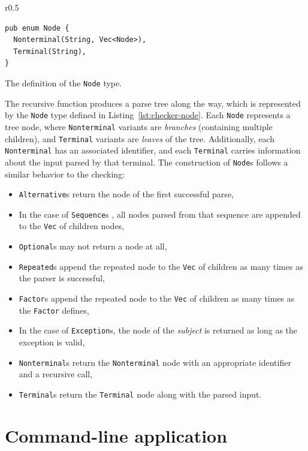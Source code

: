 \documentclass[english,bachelors,forcepolishlogotype]{wizthesis}
\begin{document}
\begin{wraplisting}{r}{0.5\textwidth}
  \begin{verbatim}
pub enum Node {
  Nonterminal(String, Vec<Node>),
  Terminal(String),
}
  \end{verbatim}
  \caption{The definition of the \texttt{Node} type.}
  \label{lst:checker-node}
\end{wraplisting}

The recursive function produces a parse tree along the way, which is represented
by the \texttt{Node} type defined in Listing~\ref{lst:checker-node}. Each
\texttt{Node} represents a tree node, where \texttt{Nonterminal} variants are
\emph{branches} (containing multiple children), and \texttt{Terminal} variants
are \emph{leaves} of the tree. Additionally, each \texttt{Nonterminal} has an
associated identifier, and each \texttt{Terminal} carries information about the
input parsed by that terminal. The construction of \texttt{Node}s follows a
similar behavior to the checking:
\begin{itemize}
  \item \texttt{Alternative}s return the node of the first successful parse,
  \item In the case of \texttt{Sequence}s , all nodes parsed from that sequence
  are appended to the \texttt{Vec} of children nodes,
  \item \texttt{Optional}s may not return a node at all,
  \item \texttt{Repeated}s append the repeated node to the \texttt{Vec} of
  children as many times as the parser is successful,
  \item \texttt{Factor}s append the repeated node to the \texttt{Vec} of
  children as many times as the \texttt{Factor} defines,
  \item In the case of \texttt{Exception}s, the node of the \emph{subject} is
  returned as long as the exception is valid,
  \item \texttt{Nonterminal}s return the \texttt{Nonterminal} node with an
  appropriate identifier and a recursive call,
  \item \texttt{Terminal}s return the \texttt{Terminal} node along with the
  parsed input.
\end{itemize}

\newpage

\section{Command-line application} \label{sec:command-line-application}
\end{document}
